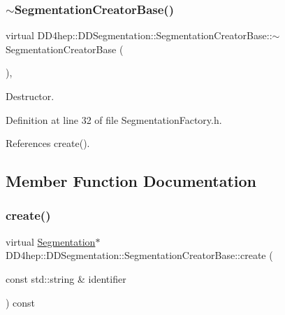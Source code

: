 \hypertarget{class_d_d4hep_1_1_d_d_segmentation_1_1_segmentation_creator_base_aa389c741b4df8a82ff944fed42b3dbf7}{}\label{class_d_d4hep_1_1_d_d_segmentation_1_1_segmentation_creator_base_aa389c741b4df8a82ff944fed42b3dbf7} 
\subsubsection{\texorpdfstring{$\sim$\+Segmentation\+Creator\+Base()}{~SegmentationCreatorBase()}}
{\footnotesize\ttfamily virtual D\+D4hep\+::\+D\+D\+Segmentation\+::\+Segmentation\+Creator\+Base\+::$\sim$\+Segmentation\+Creator\+Base (\begin{DoxyParamCaption}{ }\end{DoxyParamCaption})\hspace{0.3cm}{\ttfamily [inline]}, {\ttfamily [virtual]}}



Destructor. 



Definition at line 32 of file Segmentation\+Factory.\+h.



References create().



\subsection{Member Function Documentation}
\hypertarget{class_d_d4hep_1_1_d_d_segmentation_1_1_segmentation_creator_base_aad60d04fe90588d97eeb8030f8d6daa3}{}\label{class_d_d4hep_1_1_d_d_segmentation_1_1_segmentation_creator_base_aad60d04fe90588d97eeb8030f8d6daa3} 
\subsubsection{\texorpdfstring{create()}{create()}}
{\footnotesize\ttfamily virtual \hyperlink{class_d_d4hep_1_1_d_d_segmentation_1_1_segmentation}{Segmentation}$\ast$ D\+D4hep\+::\+D\+D\+Segmentation\+::\+Segmentation\+Creator\+Base\+::create (\begin{DoxyParamCaption}\item[{const std\+::string \&}]{identifier }\end{DoxyParamCaption}) const\hspace{0.3cm}{\ttfamily [pure virtual]}}



